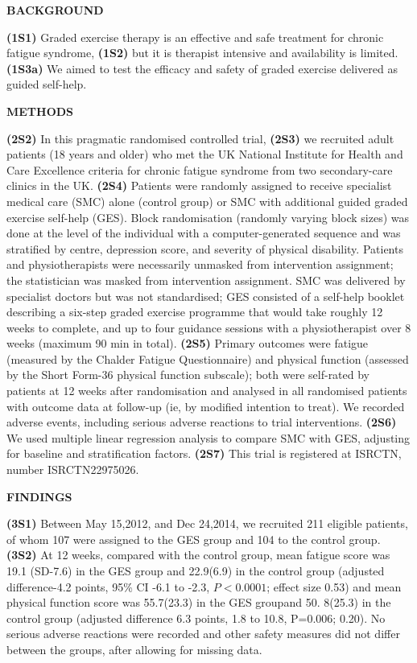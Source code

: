 \documentclass[a4paper]{ctexbook}
\begin{document}
\begin{sample}[label={myautocounter}]{\heiti}
  \textbf{BACKGROUND}

  \textbf{(1S1)} Graded exercise therapy is an effective and safe treatment for chronic fatigue syndrome, \textbf{(1S2)} but it is therapist intensive and availability is limited. \textbf{(1S3a)} We aimed to test the efficacy and safety of graded exercise delivered as guided self-help.
  
  \textbf{METHODS}

  \textbf{(2S2)} In this pragmatic randomised controlled trial, \textbf{(2S3)} we recruited adult patients (18 years and older) who met the UK National Institute for Health and Care Excellence criteria for chronic fatigue syndrome from two secondary-care clinics in the UK. \textbf{(2S4)} Patients were randomly assigned to receive specialist medical care (SMC) alone (control group) or SMC with additional guided graded exercise self-help (GES). Block randomisation (randomly varying block sizes) was done at the level of the individual with a computer-generated sequence and was stratified by centre, depression score, and severity of physical disability. Patients and physiotherapists were necessarily unmasked from intervention assignment; the statistician was masked from intervention assignment. SMC was delivered by specialist doctors but was not standardised; GES consisted of a self-help booklet describing a six-step graded exercise programme that would take roughly 12 weeks to complete, and up to four guidance sessions with a physiotherapist over 8 weeks (maximum 90 min in total). \textbf{(2S5)} Primary outcomes were fatigue (measured by the Chalder Fatigue Questionnaire) and physical function (assessed by the Short Form-36 physical function subscale); both were self-rated by patients at 12 weeks after randomisation and analysed in all randomised patients with outcome data at follow-up (ie, by modified intention to treat). We recorded adverse events, including serious adverse reactions to trial interventions.\textbf{ (2S6) }We used multiple linear regression analysis to compare SMC with GES, adjusting for baseline and stratification factors.\textbf{ (2S7) }This trial is registered at ISRCTN, number ISRCTN22975026.
  
  \textbf{FINDINGS}

  \textbf{(3S1)} Between May 15,2012, and Dec 24,2014, we recruited 211 eligible patients, of whom 107 were assigned to the GES group and 104 to the control group. \textbf{(3S2) }At 12 weeks, compared with the control group, mean fatigue score was 19.1 (SD-7.6) in the GES group and
  22.9(6.9) in the control group (adjusted difference-4.2 points, 95\% CI -6.1 to -2.3, $P<0.0 001$; effect size 0.53) and mean physical function score was 55.7(23.3) in the GES groupand 50. 8(25.3) in the control group (adjusted difference 6.3 points, 1.8 to 10.8, P=0.006;
  0.20). No serious adverse reactions were recorded and other safety measures did not differ between the groups, after allowing for missing data.


\end{sample}
\end{document}
